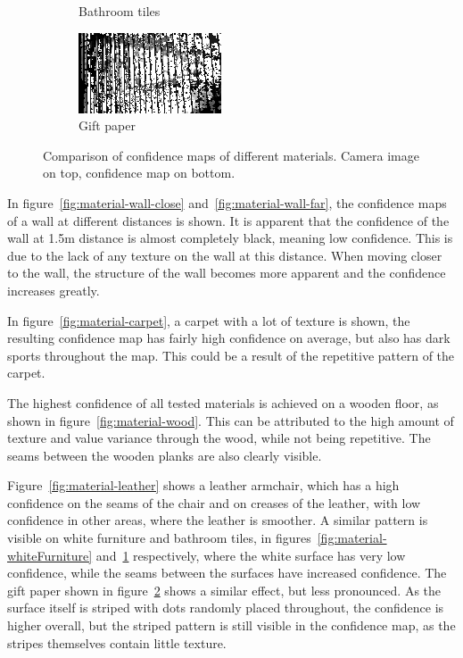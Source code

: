 \begin{figure}[h!tb]
\begin{subfigure}[b]{0.25\textwidth}
        \caption{Bathroom tiles}
        \label{fig:material-tiles}
    \end{subfigure}%
    \begin{subfigure}[b]{0.25\textwidth}
        \centering
        \includegraphics[width=0.9\linewidth]{images/materials/giftpaper-conf}
        \caption{Gift paper}
        \label{fig:material-giftpaper}
    \end{subfigure}%

    \caption{Comparison of confidence maps of different materials. Camera image on top, confidence map on bottom.}
    \label{fig:materials}
\end{figure}

In figure~\ref{fig:material-wall-close} and~\ref{fig:material-wall-far}, the confidence maps of a wall at different distances is shown.
It is apparent that the confidence of the wall at 1.5m distance is almost completely black, meaning low confidence.
This is due to the lack of any texture on the wall at this distance.
When moving closer to the wall, the structure of the wall becomes more apparent and the confidence increases greatly.

In figure~\ref{fig:material-carpet}, a carpet with a lot of texture is shown, the resulting confidence map has fairly high confidence on average,
but also has dark sports throughout the map.
This could be a result of the repetitive pattern of the carpet.

The highest confidence of all tested materials is achieved on a wooden floor, as shown in figure~\ref{fig:material-wood}.
This can be attributed to the high amount of texture and value variance through the wood, while not being repetitive.
The seams between the wooden planks are also clearly visible.

Figure~\ref{fig:material-leather} shows a leather armchair, which has a high confidence on the seams of the chair and
on creases of the leather, with low confidence in other areas, where the leather is smoother.
A similar pattern is visible on white furniture and bathroom tiles, in figures~\ref{fig:material-whiteFurniture} and~\ref{fig:material-tiles} respectively,
where the white surface has very low confidence, while the seams between the surfaces have increased confidence.
The gift paper shown in figure~\ref{fig:material-giftpaper} shows a similar effect, but less pronounced.
As the surface itself is striped with dots randomly placed throughout, the confidence is higher overall,
but the striped pattern is still visible in the confidence map, as the stripes themselves contain little texture.

